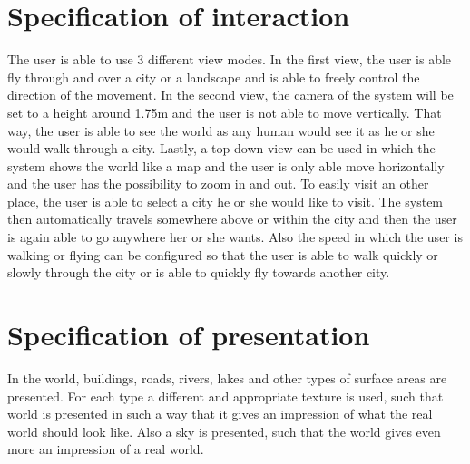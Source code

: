 \section{Specification of interaction}
\label{sec:SpecificationOfInteraction}
The user is able to use 3 different view modes. In the first view, the user is able fly through and over a city or a landscape and is able to freely control the direction of the movement. In the second view, the camera of the system will be set to a height around 1.75m and the user is not able to move vertically. That way, the user is able to see the world as any human would see it as he or she would walk through a city. Lastly, a top down view can be used in which the system shows the world like a map and the user is only able move horizontally and the user has the possibility to zoom in and out. To easily visit an other place, the user is able to select a city he or she would like to visit. The system then automatically travels somewhere above or within the city and then the user is again able to go anywhere her or she wants. Also the speed in which the user is walking or flying can be configured so that the user is able to walk quickly or slowly through the city or is able to quickly fly towards another city.

\section{Specification of presentation}
\label{sec:SpecificationOfPresentation}
In the world, buildings, roads, rivers, lakes and other types of surface areas are presented. For each type a different and appropriate texture is used, such that world is presented in such a way that it gives an impression of what the real world should look like. Also a sky is presented, such that the world gives even more an impression of a real world.